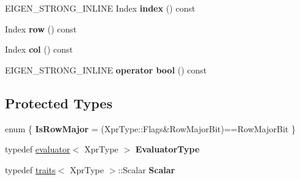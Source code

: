 \begin{DoxyCompactItemize}
E\+I\+G\+E\+N\+\_\+\+S\+T\+R\+O\+N\+G\+\_\+\+I\+N\+L\+I\+NE Index {\bfseries index} () const
\item 
\mbox{\label{class_eigen_1_1internal_1_1inner__iterator__selector_3_01_xpr_type_00_01_index_based_01_4_a480e69699b4bdc3231fcf9654b96cddc}} 
Index {\bfseries row} () const
\item 
\mbox{\label{class_eigen_1_1internal_1_1inner__iterator__selector_3_01_xpr_type_00_01_index_based_01_4_a75220d085c1511abaa4fcaa85052abc6}} 
Index {\bfseries col} () const
\item 
\mbox{\label{class_eigen_1_1internal_1_1inner__iterator__selector_3_01_xpr_type_00_01_index_based_01_4_a672740c7a1326f30e85bb43618eeef2b}} 
E\+I\+G\+E\+N\+\_\+\+S\+T\+R\+O\+N\+G\+\_\+\+I\+N\+L\+I\+NE {\bfseries operator bool} () const
\end{DoxyCompactItemize}
\subsection*{Protected Types}
\begin{DoxyCompactItemize}
\item 
\mbox{\label{class_eigen_1_1internal_1_1inner__iterator__selector_3_01_xpr_type_00_01_index_based_01_4_a8204647aa59a76e5333f266e44d6a281}} 
enum \{ {\bfseries Is\+Row\+Major} = (Xpr\+Type\+::Flags\&Row\+Major\+Bit)==Row\+Major\+Bit
 \}
\item 
\mbox{\label{class_eigen_1_1internal_1_1inner__iterator__selector_3_01_xpr_type_00_01_index_based_01_4_aa876c40ec31043c11f4d285896d66068}} 
typedef \mbox{\hyperlink{struct_eigen_1_1internal_1_1evaluator}{evaluator}}$<$ Xpr\+Type $>$ {\bfseries Evaluator\+Type}
\item 
\mbox{\label{class_eigen_1_1internal_1_1inner__iterator__selector_3_01_xpr_type_00_01_index_based_01_4_a42e5e94d0accb68d40ffd26489d58a2c}} 
typedef \mbox{\hyperlink{struct_eigen_1_1internal_1_1traits}{traits}}$<$ Xpr\+Type $>$\+::Scalar {\bfseries Scalar}
\end{DoxyCompactItemize}
